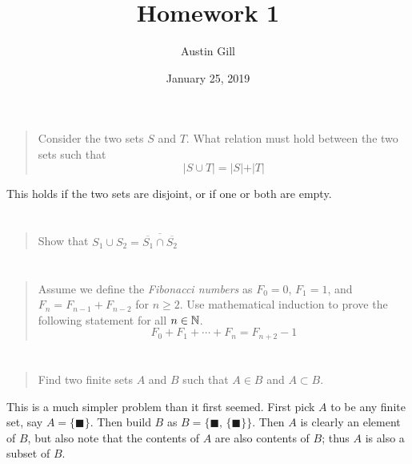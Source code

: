 \documentclass{article}
\title{Homework 1}
\author{Austin Gill}
\date{January 25, 2019}
\begin{document}
\maketitle

\section{}
\begin{quote}
    Consider the two sets $S$ and $T$. What relation must hold between the
    two sets such that
    \[\vert S \cup T \vert = \vert S \vert + \vert T \vert \]
\end{quote}
This holds if the two sets are disjoint, or if one or both are empty.

\section{}
\begin{quote}
    Show that $S_1 \cup S_2 = \overline{\overline{S_1} \cap \overline{S_2}}$
\end{quote}


\section{}
\begin{quote}
    Assume we define the \textit{Fibonacci numbers} as $F_0 = 0$, $F_1 = 1$,
    and $F_n = F_{n-1} + F_{n-2}$ for $n \geq 2$. Use mathematical induction to
    prove the following statement for all $n \in \mathbb{N}$.
    \[F_0 + F_1 + \cdots + F_n = F_{n + 2} - 1\]
\end{quote}


\section{}
\begin{quote}
    Find two finite sets $A$ and $B$ such that $A \in B$ and $A \subset B$.
\end{quote}

This is a much simpler problem than it first seemed. First pick $A$ to be any finite set, say $A =
    \{\blacksquare \}$. Then build $B$ as $B = \big \{\blacksquare,\, \{\blacksquare \} \big \}$.
Then $A$ is clearly an element of $B$, but also note that the contents of $A$ are also
contents of $B$; thus $A$ is also a subset of $B$.
\end{document}
